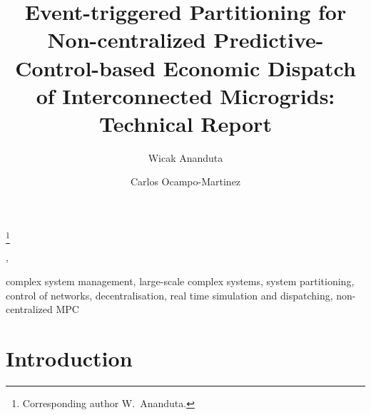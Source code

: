 \documentclass[twocolumn]{autart}    %
\begin{document}
\begin{frontmatter}

\title{Event-triggered Partitioning for Non-centralized Predictive-Control-based Economic Dispatch of Interconnected Microgrids: Technical Report \vspace{-20pt}} %

\thanks[footnoteinfo]{%
Corresponding author W.~Ananduta.}

\author[delft]{Wicak Ananduta},    %
\author[iri]{Carlos Ocampo-Martinez}  %
\address[delft]{Delft Center for Systems and Control, TU Delft}
\address[iri]{Automatic Control Department, Universitat Polit\`{e}cnica de Catalunya}  %

          
\begin{keyword}                           %
	complex system management, large-scale complex systems, system partitioning, control of networks, decentralisation, real time simulation and dispatching, non-centralized MPC 						              %
\end{keyword}                             %


\begin{abstract}                          %

\end{abstract}

\end{frontmatter}

\section{Introduction}

\end{document}
